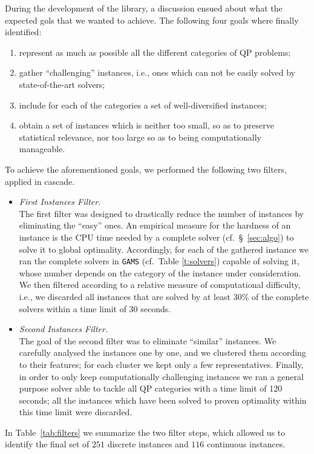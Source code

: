 During the development of the library, a discussion ensued about what
the expected gols that we wanted to achieve. The following four goals
where finally identified:
%
\begin{enumerate}
 \item represent as much as possible all the different categories of QP
       problems;
 \item gather ``challenging'' instances, i.e., ones which can not be easily
       solved by  state-of-the-art solvers;
 \item include for each of the categories a set of well-diversified
       instances;
 \item obtain a set of instances which is neither too small, so as to
       preserve statistical relevance, nor too large so as to being
       computationally manageable.
\end{enumerate}
%
To achieve the aforementioned goals, we performed the following two
filters, applied in cascade.
%
\begin{itemize}
 \item \emph{First Instances Filter.}\\
       The first filter was designed to drastically reduce the number of
       instances by eliminating the ``easy'' ones. An empirical measure
       for the hardness of an instance is the CPU time needed by a
       complete solver (cf.~\S~\ref{sec:algo}) to solve it to
       global optimality. Accordingly, for each of the gathered instance we
       ran the complete solvers in \texttt{GAMS} (cf.~Table \ref{t:solvers})
       capable of solving it, whose number depends on the category of the
       instance under consideration. We then filtered according to a relative
       measure of computational difficulty, i.e., we discarded all instances
       that are solved by at least 30\% of the complete solvers within a time
       limit of 30 seconds.
 \item \emph{Second Instances Filter.}\\
       The goal of the second filter was to eliminate ``similar'' instances.
       We carefully analysed the instances one by one, and we clustered them
       according to their features; for each cluster we kept only a few
       representatives. Finally, in order to only
       keep computationally challenging instances we ran a general purpose solver
       able to tackle all QP categories with a time limit of 120 seconds; all the
       instances which have been solved to proven optimality within this time limit
       were discarded.
\end{itemize}
%
In Table~\ref{tab:filters} we summarize the two filter steps, which
allowed us to identify the final set of $251$ discrete instances and
$116$ continuous instances.

